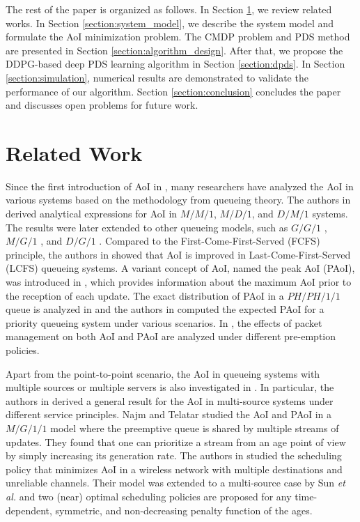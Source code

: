 \documentclass[lettersize, journal]{IEEEtran}
\begin{document}
The rest of the paper is organized as follows.
In Section \ref{section:related_work}, we review related works.
In Section \ref{section:system_model}, we describe the system model and formulate the AoI minimization problem.
The CMDP problem and PDS method are presented in Section \ref{section:algorithm_design}.
After that, we propose the DDPG-based deep PDS learning algorithm in Section \ref{section:dpds}.
In Section \ref{section:simulation}, numerical results are demonstrated to validate the performance of our algorithm.
Section \ref{section:conclusion} concludes the paper and discusses open problems for future work.

\section{Related Work} \label{section:related_work}
Since the first introduction of AoI in \cite{kaul2011minimizing}, many researchers have analyzed the AoI in various systems based on the methodology from queueing theory.
The authors in \cite{kaul2012real} derived analytical expressions for AoI in $M/M/1$, $M/D/1$, and $D/M/1$ systems.
The results were later extended to other queueing models, such as $G/G/1$ \cite{soysal2019age}, $M/G/1$ \cite{sac2018age}, and $D/G/1$ \cite{champati2018statistical}.
Compared to the First-Come-First-Served (FCFS) principle, the authors in \cite{kaul2012status} showed that AoI is improved in Last-Come-First-Served (LCFS) queueing systems.
A variant concept of AoI, named the peak AoI (PAoI), was introduced in \cite{costa2014age},
which provides information about the maximum AoI prior to the reception of each update.
The exact distribution of PAoI in a $PH/PH/1/1$ queue is analyzed in \cite{akar2020finding}
and the authors in \cite{xu2020peak} computed the expected PAoI for a priority queueing system under various scenarios.
In \cite{costa2016age}, the effects of packet management on both AoI and PAoI are analyzed under different pre-emption policies.

Apart from the point-to-point scenario, the AoI in queueing systems with multiple sources or multiple servers is also investigated in \cite{yates2018age, najm2018status, kadota2016minimizing, sun2018age}.
In particular, the authors in \cite{yates2018age} derived a general result for the AoI in multi-source systems under different service principles.
Najm and Telatar \cite{najm2018status} studied the AoI and PAoI in a $M/G/1/1$ model
where the preemptive queue is shared by multiple streams of updates.
They found that one can prioritize a stream from an age point of view by simply increasing its generation rate.
The authors in \cite{kadota2016minimizing} studied the scheduling policy that minimizes AoI in a wireless network with multiple destinations and unreliable channels.
Their model was extended to a multi-source case by Sun \textit{et al.} \cite{sun2018age}
and two (near) optimal scheduling policies are proposed for
any time-dependent, symmetric, and non-decreasing penalty function of the ages.
\end{document}
